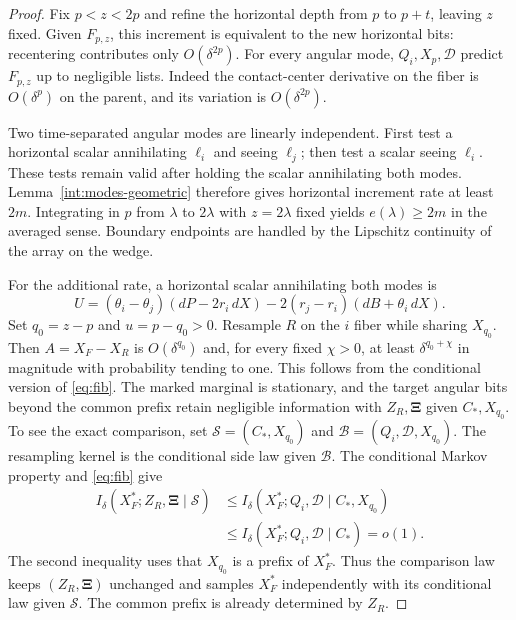 \begin{proof}
Fix $p<z<2p$ and refine the horizontal depth from
$p$ to $p+t$, leaving $z$ fixed. Given $F_{p,z}$,
this increment is equivalent to the new horizontal
bits: recentering contributes only
$O(\delta^{2p})$. For every angular mode,
$Q_i,X_p,\mathcal D$ predict $F_{p,z}$ up to
negligible lists. Indeed the contact-center
derivative on the fiber is $O(\delta^p)$ on
the parent, and its variation is
$O(\delta^{2p})$.

Two time-separated angular modes are linearly
independent. First test a horizontal scalar
annihilating $\ell_i$ and seeing $\ell_j$;
then test a scalar seeing $\ell_i$. These
tests remain valid after holding the scalar
annihilating both modes. Lemma~\ref{int:modes-geometric}
therefore gives horizontal increment rate
at least $2m$. Integrating in $p$ from
$\lambda$ to $2\lambda$ with $z=2\lambda$
fixed yields $e(\lambda)\geq2m$ in the
averaged sense. Boundary endpoints are
handled by the Lipschitz continuity of
the array on the wedge.

For the additional rate, a horizontal scalar
annihilating both modes is
\begin{equation}\label{int:normal-horizontal}
 U=(\theta_i-\theta_j)(dP-2r_i\,dX)
       -2(r_j-r_i)(dB+\theta_i\,dX).
\end{equation}
Set $q_0=z-p$ and $u=p-q_0>0$. Resample $R$
on the $i$ fiber while sharing $X_{q_0}$.
Then $A=X_F-X_R$ is $O(\delta^{q_0})$ and,
for every fixed $\chi>0$, at least
$\delta^{q_0+\chi}$ in magnitude with
probability tending to one. This follows
from the conditional version of
\eqref{eq:fib}. The marked marginal is
stationary, and the target angular bits
beyond the common prefix retain negligible
information with $Z_R,\boldsymbol\Xi$
given $C_*,X_{q_0}$. To see the exact comparison,
set $\mathcal S=(C_*,X_{q_0})$ and
$\mathcal B=(Q_i,\mathcal D,X_{q_0})$.
The resampling kernel is the conditional side
law given $\mathcal B$. The conditional Markov
property and \eqref{eq:fib} give
\[
 \begin{split}
 I_\delta(X_F^*;Z_R,\boldsymbol\Xi\mid\mathcal S)
 &\leq I_\delta(X_F^*;Q_i,\mathcal D
                             \mid C_*,X_{q_0})\\
 &\leq I_\delta(X_F^*;Q_i,\mathcal D\mid C_*)=o(1).
 \end{split}
\]
The second inequality uses that $X_{q_0}$ is a
prefix of $X_F^*$. Thus the comparison law keeps
$(Z_R,\boldsymbol\Xi)$ unchanged and samples
$X_F^*$ independently with its conditional law
given $\mathcal S$. The common prefix is already
determined by $Z_R$.


\end{proof}
